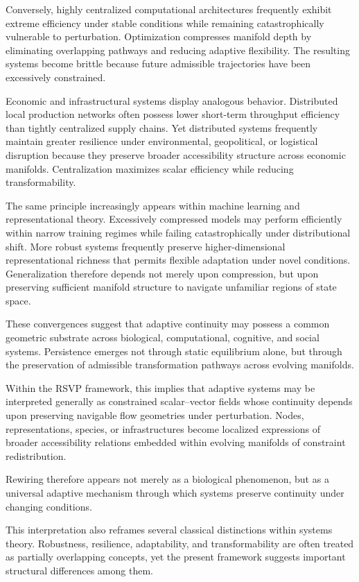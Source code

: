 \documentclass[11pt,a4paper]{article}
\begin{document}
Conversely, highly centralized computational architectures frequently exhibit extreme efficiency under stable conditions while remaining catastrophically vulnerable to perturbation. Optimization compresses manifold depth by eliminating overlapping pathways and reducing adaptive flexibility. The resulting systems become brittle because future admissible trajectories have been excessively constrained.

Economic and infrastructural systems display analogous behavior. Distributed local production networks often possess lower short-term throughput efficiency than tightly centralized supply chains. Yet distributed systems frequently maintain greater resilience under environmental, geopolitical, or logistical disruption because they preserve broader accessibility structure across economic manifolds. Centralization maximizes scalar efficiency while reducing transformability.

The same principle increasingly appears within machine learning and representational theory. Excessively compressed models may perform efficiently within narrow training regimes while failing catastrophically under distributional shift. More robust systems frequently preserve higher-dimensional representational richness that permits flexible adaptation under novel conditions. Generalization therefore depends not merely upon compression, but upon preserving sufficient manifold structure to navigate unfamiliar regions of state space.

These convergences suggest that adaptive continuity may possess a common geometric substrate across biological, computational, cognitive, and social systems. Persistence emerges not through static equilibrium alone, but through the preservation of admissible transformation pathways across evolving manifolds.

Within the RSVP framework, this implies that adaptive systems may be interpreted generally as constrained scalar--vector fields whose continuity depends upon preserving navigable flow geometries under perturbation. Nodes, representations, species, or infrastructures become localized expressions of broader accessibility relations embedded within evolving manifolds of constraint redistribution.

Rewiring therefore appears not merely as a biological phenomenon, but as a universal adaptive mechanism through which systems preserve continuity under changing conditions.

This interpretation also reframes several classical distinctions within systems theory. Robustness, resilience, adaptability, and transformability are often treated as partially overlapping concepts, yet the present framework suggests important structural differences among them.
\end{document}
